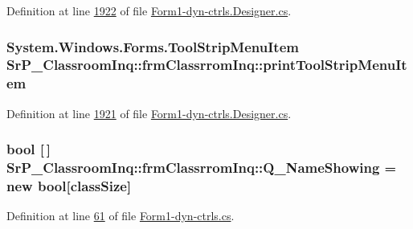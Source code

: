 \-Definition at line \hyperlink{_form1-dyn-ctrls_8_designer_8cs_source_l01922}{1922} of file \hyperlink{_form1-dyn-ctrls_8_designer_8cs_source}{\-Form1-\/dyn-\/ctrls.\-Designer.\-cs}.

\hypertarget{class_sr_p___classroom_inq_1_1frm_classrrom_inq_ab2355ecf8174002162a103a7e7ee83f4}{
\subsubsection[{print\-Tool\-Strip\-Menu\-Item}]{\setlength{\rightskip}{0pt plus 5cm}\-System.\-Windows.\-Forms.\-Tool\-Strip\-Menu\-Item {\bf \-Sr\-P\-\_\-\-Classroom\-Inq\-::frm\-Classrrom\-Inq\-::print\-Tool\-Strip\-Menu\-Item}}}
\label{class_sr_p___classroom_inq_1_1frm_classrrom_inq_ab2355ecf8174002162a103a7e7ee83f4}


\-Definition at line \hyperlink{_form1-dyn-ctrls_8_designer_8cs_source_l01921}{1921} of file \hyperlink{_form1-dyn-ctrls_8_designer_8cs_source}{\-Form1-\/dyn-\/ctrls.\-Designer.\-cs}.

\hypertarget{class_sr_p___classroom_inq_1_1frm_classrrom_inq_a717931be8f79e53cf69e10515df3115e}{
\subsubsection[{\-Q\-\_\-\-Name\-Showing}]{\setlength{\rightskip}{0pt plus 5cm}bool \mbox{[}$\,$\mbox{]} {\bf \-Sr\-P\-\_\-\-Classroom\-Inq\-::frm\-Classrrom\-Inq\-::\-Q\-\_\-\-Name\-Showing} = new bool\mbox{[}{\bf class\-Size}\mbox{]}}}
\label{class_sr_p___classroom_inq_1_1frm_classrrom_inq_a717931be8f79e53cf69e10515df3115e}


\-Definition at line \hyperlink{_form1-dyn-ctrls_8cs_source_l00061}{61} of file \hyperlink{_form1-dyn-ctrls_8cs_source}{\-Form1-\/dyn-\/ctrls.\-cs}.

